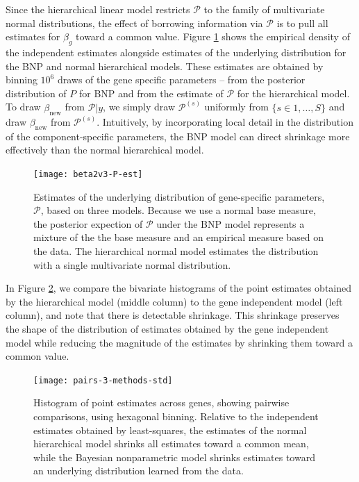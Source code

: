 {Since the hierarchical linear model restricts $\mathcal{P}$ to the family of multivariate normal distributions, the effect of borrowing information via $\mathcal{P}$ is to pull all estimates for $\beta_g$ toward a common value. Figure \ref{P-compare} shows the empirical density of the independent estimates alongside estimates of the underlying distribution for the BNP and normal hierarchical models. These estimates are obtained by binning $10^6$ draws of the gene specific parameters -- from the posterior distribution of $P$ for BNP and from the estimate of $\mathcal{P}$ for the hierarchical model. To draw $\beta_{\mbox{new}}$ from $\mathcal{P}|y$, we simply draw $\mathcal{P}^{(s)}$ uniformly from $\{s\in 1, \ldots, S\}$ and draw $\beta_{\mbox{new}}$ from $\mathcal{P}^{(s)}$. Intuitively, by incorporating local detail in the distribution of the component-specific parameters, the BNP model can direct shrinkage more effectively than the normal hierarchical model.
\begin{figure}
\centering
\texttt{[image: beta2v3-P-est]}
\caption{\small Estimates of the underlying distribution of gene-specific parameters, $\mathcal{P}$, based on three models. Because we use a normal base measure,  the posterior expection of $\mathcal{P}$ under the BNP model represents a mixture of the the base measure and an empirical measure based on the data. The hierarchical normal model estimates the distribution with a single multivariate normal distribution.}
\label{P-compare}
\end{figure}
In Figure \ref{pairs-3-methods}, we compare the bivariate histograms of the point estimates obtained by the hierarchical model (middle column) to the gene independent model (left column), and note that there is detectable shrinkage. This shrinkage preserves the shape of the distribution of estimates obtained by the gene independent model while reducing the magnitude of the estimates by shrinking them toward a common value.
\begin{figure}[ht]
\centering
\texttt{[image: pairs-3-methods-std]}
\caption{Histogram of point estimates across genes, showing pairwise comparisons, using hexagonal binning. Relative to the independent estimates obtained by least-squares, the estimates of the normal hierarchical model shrinks all estimates toward a common mean, while the Bayesian nonparametric model shrinks estimates toward an underlying distribution learned from the data.}
\label{pairs-3-methods}
\end{figure}
}
